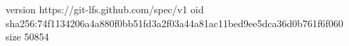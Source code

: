 version https://git-lfs.github.com/spec/v1
oid sha256:74f1134206a4a880f0bb51fd3a2f03a44a81ac11bed9ee5dca36d0b761f6f060
size 50854
